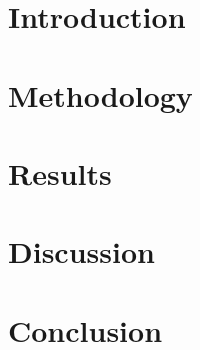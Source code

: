 \section{Introduction}
\section{Methodology}
\section{Results}
\section{Discussion}
\section{Conclusion}
